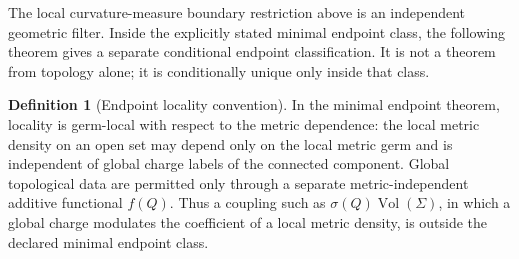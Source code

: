 \documentclass[11pt,a4paper]{article}
\numberwithin{equation}{section}
\theoremstyle{definition}
\newtheorem{definition}[criterion]{Definition}
\theoremstyle{plain}
\theoremstyle{remark}
\begin{document}
The local curvature-measure boundary restriction above is an independent geometric filter. Inside the explicitly stated minimal endpoint class, the following theorem gives a separate conditional endpoint classification. It is not a theorem from topology alone; it is conditionally unique only inside that class.

\begin{definition}[Endpoint locality convention]
In the minimal endpoint theorem, locality is germ-local with respect to the
metric dependence: the local metric density on an open set may depend only
on the local metric germ and is independent of global charge labels of the
connected component. Global topological data are permitted only through a
separate metric-independent additive functional \(f(Q)\). Thus a coupling
such as \(\sigma(Q)\operatorname{Vol}(\Sigma)\), in which a global charge
modulates the coefficient of a local metric density, is outside the declared
minimal endpoint class.
\end{definition}
\end{document}
